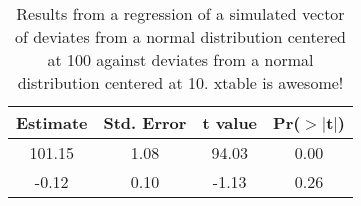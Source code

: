 \begin{table}[ht]
\centering
\caption{Results from a regression of a simulated vector of deviates from a normal distribution centered at 100 against deviates from a normal distribution centered at 10. xtable is awesome!} 
\label{table:lm_results}
\begin{tabular}{cccc}
  \hline
Estimate & Std. Error & t value & Pr($>$$|$t$|$) \\ 
  \hline
101.15 & 1.08 & 94.03 & 0.00 \\ 
  -0.12 & 0.10 & -1.13 & 0.26 \\ 
   \hline
\end{tabular}
\end{table}
